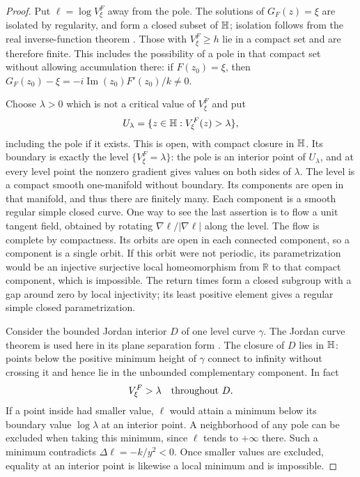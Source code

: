 \begin{proof}
Put $\ell=\log V^F_\xi$ away from the pole.
The solutions of $G_F(z)=\xi$ are isolated by regularity, and form a closed
subset of $\mathbb H$; isolation follows from the real inverse-function theorem
\cite[Theorem~C.34]{Lee2013}.  Those with $V^F_\xi\ge h$ lie in a compact set and are
therefore finite.  This includes the possibility of a pole in that compact
set without allowing accumulation there: if $F(z_0)=\xi$, then
$G_F(z_0)-\xi=-i\operatorname{Im}(z_0)F'(z_0)/k\ne0$.

Choose $\lambda>0$ which is not a critical value of $V^F_\xi$ and put
\[
 U_\lambda=\{z\in\mathbb H:V^F_\xi(z)>\lambda\},
\]
including the pole if it exists.  This is open, with compact closure in
$\mathbb H$.  Its boundary is exactly the level $\{V^F_\xi=\lambda\}$:
the pole is an interior point of $U_\lambda$, and at every level point the
nonzero gradient gives values on both sides of $\lambda$.
The level is a compact smooth one-manifold without boundary.  Its
components are open in that manifold, and thus there are finitely many.
Each component is a smooth regular simple closed curve.  One way to see
the last assertion is to flow a unit tangent field, obtained by rotating
$\nabla\ell/|\nabla\ell|$ along the level.  The flow is complete by
compactness.  Its orbits are open in each connected component, so a
component is a single orbit.  If this orbit were not periodic, its
parametrization would be an injective surjective local homeomorphism from
$\mathbb R$ to that compact component, which is impossible.  The return
times form a closed subgroup with a gap around zero by local injectivity;
its least positive element gives a regular simple closed parametrization.

Consider the bounded Jordan interior $D$ of one level curve $\gamma$.
The Jordan curve theorem is used here in its plane separation form
\cite[Theorem~63.4]{Munkres2014}.  The closure of $D$ lies in $\mathbb H$:
points below the positive minimum height of $\gamma$ connect to infinity
without crossing it and hence lie in the unbounded complementary
component.  In fact
\begin{equation}
 V^F_\xi>\lambda\quad\hbox{throughout }D.
 \label{eq:jordan-interior-superlevel}
\end{equation}
If a point inside had smaller value, $\ell$ would attain a minimum below
its boundary value $\log\lambda$ at an interior point.  A neighborhood of
any pole can be excluded when taking this minimum, since $\ell$ tends to
$+\infty$ there.  Such a minimum contradicts
$\Delta\ell=-k/y^2<0$.  Once smaller values are excluded, equality at an
interior point is likewise a local minimum and is impossible.


\end{proof}
